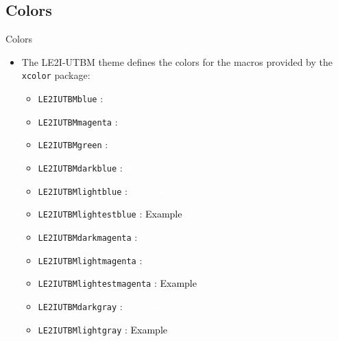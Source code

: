 \documentclass[english,sectioncirclenumberstyle]{le2iutbmbeamer}
\begin{document}
\subsection{Colors}

\begin{frame}{Colors}
	\begin{itemize}
	\item The LE2I-UTBM theme defines the colors for the macros provided by the \texttt{xcolor} package:
		\begin{itemize}
		\item \texttt{LE2IUTBMblue} : \fbox{\textcolor{LE2IUTBMblue}{Example}} \colorbox{LE2IUTBMblue}{\textcolor{white}{Example}}
		\vfill
		\item \texttt{LE2IUTBMmagenta} : \fbox{\textcolor{LE2IUTBMmagenta}{Example}} \colorbox{LE2IUTBMmagenta}{\textcolor{white}{Example}}
		\vfill
		\item \texttt{LE2IUTBMgreen} : \fbox{\textcolor{LE2IUTBMgreen}{Example}} \colorbox{LE2IUTBMgreen}{\textcolor{white}{Example}}
		\vfill
		\item \texttt{LE2IUTBMdarkblue} : \fbox{\textcolor{LE2IUTBMdarkblue}{Example}} \colorbox{LE2IUTBMdarkblue}{\textcolor{white}{Example}}
		\vfill
		\item \texttt{LE2IUTBMlightblue} : \fbox{\textcolor{LE2IUTBMlightblue}{Example}} \colorbox{LE2IUTBMlightblue}{\textcolor{white}{Example}}
		\vfill
		\item \texttt{LE2IUTBMlightestblue} : \fbox{\textcolor{LE2IUTBMlightestblue}{Example}} \colorbox{LE2IUTBMlightestblue}{\textcolor{black}{Example}}
		\vfill
		\item \texttt{LE2IUTBMdarkmagenta} : \fbox{\textcolor{LE2IUTBMdarkmagenta}{Example}} \colorbox{LE2IUTBMdarkmagenta}{\textcolor{white}{Example}}
		\vfill
		\item \texttt{LE2IUTBMlightmagenta} : \fbox{\textcolor{LE2IUTBMlightmagenta}{Example}} \colorbox{LE2IUTBMlightmagenta}{\textcolor{white}{Example}}
		\vfill
		\item \texttt{LE2IUTBMlightestmagenta} : \fbox{\textcolor{LE2IUTBMlightestmagenta}{Example}} \colorbox{LE2IUTBMlightestmagenta}{\textcolor{black}{Example}}
		\vfill
		\item \texttt{LE2IUTBMdarkgray} : \fbox{\textcolor{LE2IUTBMdarkgray}{Example}} \colorbox{LE2IUTBMdarkgray}{\textcolor{white}{Example}}
		\vfill
		\item \texttt{LE2IUTBMlightgray} : \fbox{\textcolor{LE2IUTBMlightgray}{Example}} \colorbox{LE2IUTBMlightgray}{\textcolor{black}{Example}}
		\end{itemize}
	\end{itemize}
\end{frame}
\end{document}
